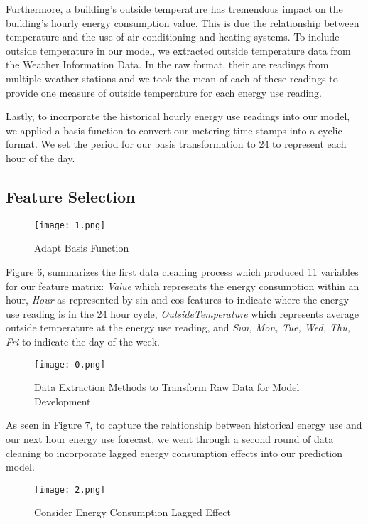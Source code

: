 \documentclass[twoside,11pt]{article}
\begin{document}
Furthermore, a building's outside temperature has tremendous impact on the building's hourly energy consumption value. This is due the relationship between temperature and the use of air conditioning and heating systems. To include outside temperature in our model, we extracted outside temperature data from the Weather Information Data. In the raw format, their are readings from multiple weather stations and we took the mean of each of these readings to provide one measure of outside temperature for each energy use reading. 

Lastly, to incorporate the historical hourly energy use readings into our model, we applied a basis function to convert our metering time-stamps into a cyclic format. We set the period for our basis transformation to 24 to represent each hour of the day.
\subsection{Feature Selection}
\begin{figure}[htbp]
  \centering 
  \texttt{[image: 1.png]} 
  \caption{Adapt Basis Function}
  \label{fig:example} 
\end{figure}


Figure 6, summarizes the first data cleaning process which produced 11 variables for our feature matrix: \textit{Value} which represents the energy consumption within an hour, \textit{Hour} as represented by sin and cos features to indicate where the energy use reading is in the 24 hour cycle, \textit{OutsideTemperature} which represents average outside temperature at the energy use reading, and \textit{Sun, Mon, Tue, Wed, Thu, Fri} to indicate the day of the week.

\begin{figure}[!htbp]
  \centering 
  \texttt{[image: 0.png]} 
  \caption{Data Extraction Methods to Transform Raw Data for Model Development}
  \label{fig:example} 
\end{figure}
\FloatBarrier

As seen in Figure 7, to capture the relationship between historical energy use and our next hour energy use forecast, we went through a second round of data cleaning to incorporate lagged energy consumption effects into our prediction model. 

\begin{figure}[!htbp]
  \centering 
  \texttt{[image: 2.png]} 
  \caption{Consider Energy Consumption Lagged Effect}
  \label{fig:example} 
\end{figure}
\FloatBarrier
\end{document}
